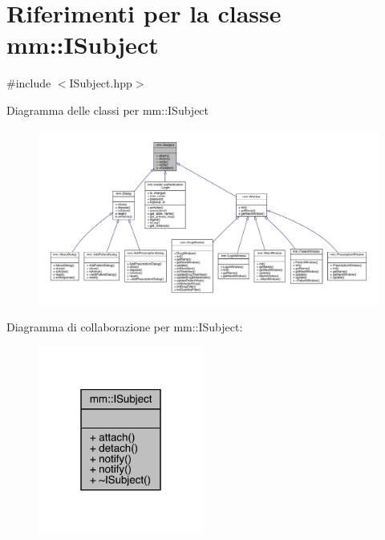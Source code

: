 \hypertarget{classmm_1_1_i_subject}{}\section{Riferimenti per la classe mm\+:\+:I\+Subject}
\label{classmm_1_1_i_subject}


{\ttfamily \#include $<$I\+Subject.\+hpp$>$}



Diagramma delle classi per mm\+:\+:I\+Subject
\nopagebreak
\begin{figure}[H]
\begin{center}
\leavevmode
\includegraphics[width=350pt]{da/d21/classmm_1_1_i_subject__inherit__graph}
\end{center}
\end{figure}


Diagramma di collaborazione per mm\+:\+:I\+Subject\+:
\nopagebreak
\begin{figure}[H]
\begin{center}
\leavevmode
\includegraphics[width=154pt]{d6/dd5/classmm_1_1_i_subject__coll__graph}
\end{center}
\end{figure}
